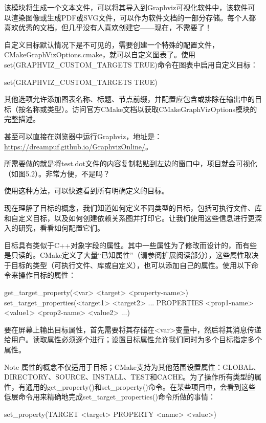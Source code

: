 该模块将生成一个文本文件，可以将其导入到Graphviz可视化软件中，该软件可以渲染图像或生成PDF或SVG文件，可以作为软件文档的一部分存储。每个人都喜欢优秀的文档，但几乎没有人喜欢创建它——现在，不需要了！

自定义目标默认情况下是不可见的，需要创建一个特殊的配置文件，CMakeGraphVizOptions.cmake，就可以自定义图表了。使用set(GRAPHVIZ\_CUSTOM\_TARGETS TRUE)命令在图表中启用自定义目标：


\begin{cmake}
set(GRAPHVIZ_CUSTOM_TARGETS TRUE)
\end{cmake}

其他选项允许添加图表名称、标题、节点前缀，并配置应包含或排除在输出中的目标（按名称或类型）。访问官方CMake文档以获取CMakeGraphVizOptions模块的完整描述。

甚至可以直接在浏览器中运行Graphviz，地址是：\url{https://dreampuf.github.io/GraphvizOnline/}。

所需要做的就是将test.dot文件的内容复制粘贴到左边的窗口中，项目就会可视化（如图5.2）。非常方便，不是吗？


使用这种方法，可以快速看到所有明确定义的目标。

现在理解了目标的概念，我们知道如何定义不同类型的目标，包括可执行文件、库和自定义目标，以及如何创建依赖关系图并打印它。让我们使用这些信息进行更深入的研究，看看如何配置它们。


目标具有类似于C++对象字段的属性。其中一些属性为了修改而设计的，而有些是只读的。CMake定义了大量“已知属性”（请参阅扩展阅读部分），这些属性取决于目标的类型（可执行文件、库或自定义），也可以添加自己的属性。使用以下命令来操作目标的属性：

\begin{shell}
get_target_property(<var> <target> <property-name>)
set_target_properties(<target1> <target2> ...
                      PROPERTIES <prop1-name> <value1>
                      <prop2-name> <value2> ...)
\end{shell}

要在屏幕上输出目标属性，首先需要将其存储在<var>变量中，然后将其消息传递给用户。读取属性必须逐个进行；设置目标属性允许我们同时为多个目标指定多个属性。

\begin{myNotic}{Note}
属性的概念不仅适用于目标；CMake支持为其他范围设置属性：GLOBAL、DIRECTORY、SOURCE、INSTALL、TEST和CACHE。为了操作所有类型的属性，有通用的get\_property()和set\_property()命令。在某些项目中，会看到这些低层命令用来精确地完成set\_target\_properties()命令所做的事情：

\begin{shell}
set_property(TARGET <target> PROPERTY <name> <value>)
\end{shell}
\end{myNotic}

